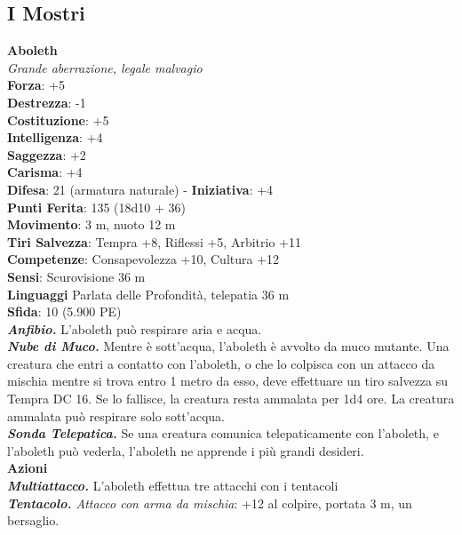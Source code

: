 \pagebreak
\subsection{I Mostri}

\bigskip

\begin{multicols}{2}

\textbf{Aboleth}\\
\emph{Grande aberrazione, legale malvagio}\\
\textbf{Forza}: +5\\
\textbf{Destrezza}: -1 \\
\textbf{Costituzione}: +5\\
\textbf{Intelligenza}: +4\\
\textbf{Saggezza}: +2\\
\textbf{Carisma}: +4\\
\textbf{Difesa}: 21 (armatura naturale) - \textbf{Iniziativa}: +4\\
\textbf{Punti Ferita}: 135 (18d10 + 36)\\
\textbf{Movimento}: 3 m, nuoto 12 m\\
\textbf{Tiri Salvezza}: Tempra +8, Riflessi +5, Arbitrio +11\\
\textbf{Competenze}: Consapevolezza +10, Cultura +12\\
\textbf{Sensi}: Scurovisione 36 m\\
\textbf{Linguaggi} Parlata delle Profondità, telepatia 36 m\\
\textbf{Sfida}: 10 (5.900 PE)\\
\smallskip
\emph{\textbf{Anfibio.}} L'aboleth può respirare aria e acqua.\\
\emph{\textbf{Nube di Muco.}} Mentre è sott'acqua, l'aboleth è avvolto da muco mutante. Una creatura che entri a contatto con l'aboleth, o che lo colpisca con un attacco da mischia mentre si trova entro 1 metro da esso, deve effettuare un tiro salvezza su Tempra DC  16. Se lo fallisce, la creatura resta ammalata per 1d4 ore. La creatura ammalata può respirare solo sott'acqua.\\
\emph{\textbf{Sonda Telepatica.}} Se una creatura comunica telepaticamente con l'aboleth, e l'aboleth può vederla, l'aboleth ne apprende i più grandi desideri. \\
\smallskip\textbf{Azioni}\\
\emph{\textbf{Multiattacco.}} L'aboleth effettua tre attacchi con i tentacoli\\
\emph{\textbf{Tentacolo.} Attacco con arma da mischia}: +12 al colpire, portata 3 m, un bersaglio.\\

\end{multicols}
